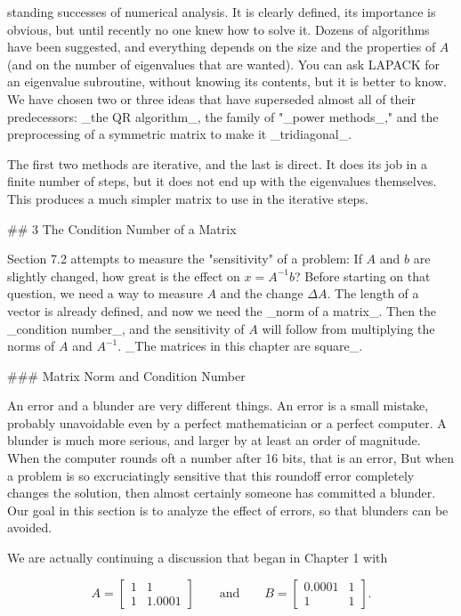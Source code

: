 standing successes of numerical analysis. It is clearly defined, its importance is obvious, but until recently no one knew how to solve it. Dozens of algorithms have been suggested, and everything depends on the size and the properties of \(A\) (and on the number of eigenvalues that are wanted). You can ask LAPACK for an eigenvalue subroutine, without knowing its contents, but it is better to know. We have chosen two or three ideas that have superseded almost all of their predecessors: _the QR algorithm_, the family of "_power methods_," and the preprocessing of a symmetric matrix to make it _tridiagonal_.

The first two methods are iterative, and the last is direct. It does its job in a finite number of steps, but it does not end up with the eigenvalues themselves. This produces a much simpler matrix to use in the iterative steps.

## 3 The Condition Number of a Matrix

Section 7.2 attempts to measure the "sensitivity" of a problem: If \(A\) and \(b\) are slightly changed, how great is the effect on \(x=A^{-1}b\)? Before starting on that question, we need a way to measure \(A\) and the change \(\Delta A\). The length of a vector is already defined, and now we need the _norm of a matrix_. Then the _condition number_, and the sensitivity of \(A\) will follow from multiplying the norms of \(A\) and \(A^{-1}\). _The matrices in this chapter are square_.

### Matrix Norm and Condition Number

An error and a blunder are very different things. An error is a small mistake, probably unavoidable even by a perfect mathematician or a perfect computer. A blunder is much more serious, and larger by at least an order of magnitude. When the computer rounds oft a number after 16 bits, that is an error, But when a problem is so excruciatingly sensitive that this roundoff error completely changes the solution, then almost certainly someone has committed a blunder. Our goal in this section is to analyze the effect of errors, so that blunders can be avoided.

We are actually continuing a discussion that began in Chapter 1 with

\[A=\begin{bmatrix}1&1\\ 1&1.0001\end{bmatrix}\qquad\text{and}\qquad B=\begin{bmatrix}0.0001&1\\ 1&1\end{bmatrix}.\]

